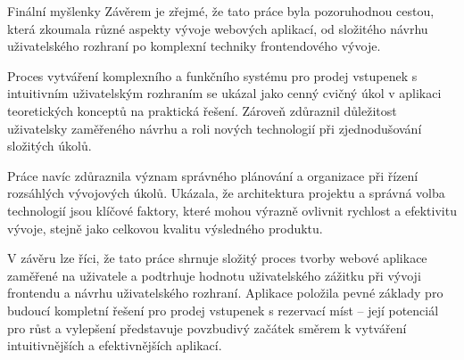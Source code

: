 \begin{section}{Finální myšlenky}
    \label{sec:zaver-myslenky}
    Závěrem je zřejmé, že tato práce byla pozoruhodnou cestou, která zkoumala různé aspekty vývoje webových aplikací, od složitého návrhu uživatelského rozhraní po komplexní techniky frontendového vývoje.

    Proces vytváření komplexního a funkčního systému pro prodej vstupenek s intuitivním uživatelským rozhraním se ukázal jako cenný cvičný úkol v aplikaci teoretických konceptů na praktická řešení.
    Zároveň zdůraznil důležitost uživatelsky zaměřeného návrhu a roli nových technologií při zjednodušování složitých úkolů.

    Práce navíc zdůraznila význam správného plánování a organizace při řízení rozsáhlých vývojových úkolů.
    Ukázala, že architektura projektu a správná volba technologií jsou klíčové faktory, které mohou výrazně ovlivnit rychlost a efektivitu vývoje, stejně jako celkovou kvalitu výsledného produktu.

    V závěru lze říci, že tato práce shrnuje složitý proces tvorby webové aplikace zaměřené na uživatele a podtrhuje hodnotu uživatelského zážitku při vývoji frontendu a návrhu uživatelského rozhraní.
    Aplikace položila pevné základy pro budoucí kompletní řešení pro prodej vstupenek s rezervací míst – její potenciál pro růst a vylepšení představuje povzbudivý začátek směrem k vytváření intuitivnějších a efektivnějších aplikací.
\end{section}


